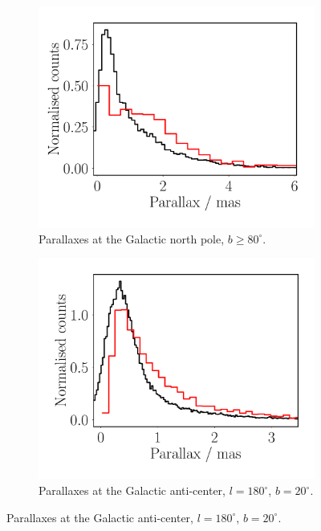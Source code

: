\documentclass[fleqn,usenatbib]{mnras}
\begin{document}
\begin{figure}
    \centering
    \begin{subfigure}[b]{0.3\textwidth}
        \centering
        \includegraphics[width=\textwidth]{Plots/plot_dist_gaia_180_85_18.pdf}
        \caption{Parallaxes at the Galactic north pole, $b \geq 80^\circ$.}
        \label{fig:NGPdist}
    \end{subfigure}
    \begin{subfigure}[b]{0.3\textwidth}
        \centering
        \includegraphics[width=\textwidth]{Plots/plot_dist_gaia_180_20_18.pdf}
        \caption{Parallaxes at the Galactic anti-center, $l = 180^\circ$, $b = 20^\circ$.}

\end{subfigure}
\end{figure}
\end{document}
